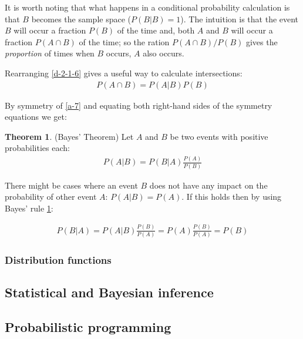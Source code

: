 \documentclass[
  oneside,
  11pt, a4paper,
  footinclude=true,
  headinclude=true,
  cleardoublepage=empty
]{scrbook}
\theoremstyle{definition}
\theoremstyle{definition}
\newtheorem{theorem}{Theorem}[section]
\begin{document}
        It is worth noting that what happens in a conditional probability calculation is that $B$ becomes the sample space ($P(B|B) = 1$). The intuition is that the event $B$ will occur a fraction $P(B)$ of the time and, both $A$ and $B$ will occur a fraction $P(A \cap B)$ of the time; so the ration $P(A \cap B)/P(B)$ gives the \emph{proportion} of times when $B$ occurs, $A$ also occurs.
        
        Rearranging \ref{d-2-1-6} gives a useful way to calculate intersections:
        \begin{align}\label{a-7}
           P(A \cap B) = P(A|B)P(B) 
        \end{align}{}
        
        By symmetry of \ref{a-7} and equating both right-hand sides of the symmetry equations we get:
        
        \begin{theorem}{(Bayes' Theorem) Let $A$ and $B$ be two events with positive probabilities each:}\label{t-bayes}
            \begin{align*}
                P(A|B) = P(B|A)\frac{P(A)}{P(B)}
            \end{align*}{}
        \end{theorem}{}
        
        There might be cases where an event $B$ does not have any impact on the probability of other event $A$: $P(A|B) = P(A)$. If this holds then by using Bayes' rule \ref{t-bayes}:
        
        \begin{align*}
            P(B|A) = P(A|B)\frac{P(B)}{P(A)} = P(A)\frac{P(B)}{P(A)} = P(B)
        \end{align*}{}
        
        \subsubsection{Distribution functions}
        
        \subsection{Statistical and Bayesian inference}
        
        \subsection{Probabilistic programming}
        
\end{document}
